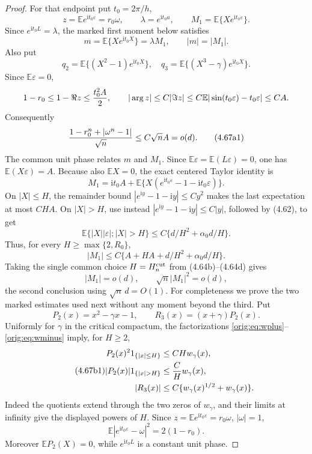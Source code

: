 \documentclass[11pt,a4paper]{article}
\numberwithin{equation}{section}
\theoremstyle{definition}
\theoremstyle{remark}
\newcommand{\E}{\mathbb E}
\newcommand{\ii}{\mathrm i}
\begin{document}
\begin{proof}
For that endpoint put $t_0=2\pi/h$,
\[
 z=\E e^{\ii t_0\varepsilon}=r_0\omega,\qquad
 \lambda=e^{\ii t_0a},\qquad
 M_1=\E\{Xe^{\ii t_0\varepsilon}\}.
\]
Since $e^{\ii t_0L}=\lambda$, the marked first moment below satisfies
\[
 m=\E\{Xe^{\ii t_0X}\}=\lambda M_1,\qquad |m|=|M_1|.   \tag{4.67a00}
\]
Also put
\[
 q_2=\E\{(X^2-1)e^{\ii t_0X}\},\quad
 q_3=\E\{(X^3-\gamma)e^{\ii t_0X}\}.                \tag{4.67a}
\]
Since $\E\varepsilon=0$,
\[
 1-r_0\le1-\Re z\le {t_0^2A\over2},\qquad
 |\arg z|\le C|\Im z|
 \le C\E|\sin(t_0\varepsilon)-t_0\varepsilon|\le CA.
\]
Consequently
\[
 {1-r_0^n+|\omega^n-1|\over\sqrt n}
 \le C\sqrt n A=o(d).                                \tag{4.67a1}
\]
The common unit phase relates $m$ and $M_1$.  Since
$\E\varepsilon=\E(L\varepsilon)=0$, one has
$\E(X\varepsilon)=A$.  Because also $\E X=0$, the exact centered Taylor
identity is
\[
 M_1=\ii t_0A+
      \E\{X(e^{\ii t_0\varepsilon}-1-\ii t_0\varepsilon)\}.       \tag{4.67a2}
\]
On $|X|\le H$, the remainder bound $|e^{\ii y}-1-\ii y|\le Cy^2$
makes the last expectation at most $CHA$.  On $|X|>H$, use instead
$|e^{\ii y}-1-\ii y|\le C|y|$, followed by (4.62), to get
\[
 \E\{|X||\varepsilon|;|X|>H\}
 \le C\{d/H^2+\alpha _0d/H\}.
\]
Thus, for every $H\ge\max\{2,R_0\}$,
\[
 |M_1|\le C\{A+HA+d/H^2+\alpha_0d/H\}.                \tag{4.67b0}
\]
Taking the single common choice $H=H_n^{\rm cut}$ from
(4.64b)--(4.64d) gives
\[
 |M_1|=o(d),\qquad \sqrt n|M_1|^2=o(d),               \tag{4.67b}
\]
the second conclusion using \(\sqrt n\,d=O(1)\).
For completeness we prove the two marked estimates used next without any
moment beyond the third.  Put
\[
 P_2(x)=x^2-\gamma x-1,\qquad R_3(x)=(x+\gamma)P_2(x).
\]
Uniformly for $\gamma$ in the critical compactum, the factorizations
\eqref{orig:eq:wplus}--\eqref{orig:eq:wminus} imply, for $H\ge2$,
\begin{equation}\tag{4.67b1}
\begin{aligned}
 P_2(x)^2 1_{\{|x|\le H\}}&\le CHw_\gamma(x),\\
 |P_2(x)|1_{\{|x|>H\}}&\le {C\over H}w_\gamma(x),\\
 |R_3(x)|&\le C\{w_\gamma(x)^{1/2}+w_\gamma(x)\}.
\end{aligned}
\end{equation}
Indeed the quotients extend through the two zeros of $w_\gamma$, and
their limits at infinity give the displayed powers of $H$.  Since
$z=\E e^{\ii t_0\varepsilon}=r_0\omega$, $|\omega|=1$,
\[
 \E|e^{\ii t_0\varepsilon}-\omega|^2=2(1-r_0).        \tag{4.67b2}
\]
Moreover $\E P_2(X)=0$, while $e^{\ii t_0L}$ is a constant unit phase.

\end{proof}
\end{document}
